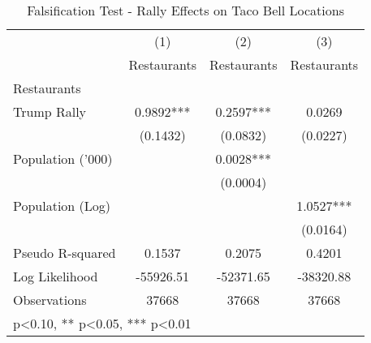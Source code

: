 \begin{table}[htbp]\centering
\def\sym#1{\ifmmode^{#1}\else\(^{#1}\)\fi}
\caption{Falsification Test - Rally Effects on Taco Bell Locations}
\begin{tabular}{l*{3}{c}}
\hline\hline
                    &\multicolumn{1}{c}{(1)}   &\multicolumn{1}{c}{(2)}   &\multicolumn{1}{c}{(3)}   \\
                    & Restaurants   & Restaurants   & Restaurants   \\
\hline
Restaurants         &               &               &               \\
Trump Rally         &      0.9892***&      0.2597***&      0.0269   \\
                    &    (0.1432)   &    (0.0832)   &    (0.0227)   \\
Population ('000)   &               &      0.0028***&               \\
                    &               &    (0.0004)   &               \\
Population (Log)    &               &               &      1.0527***\\
                    &               &               &    (0.0164)   \\
\hline
Pseudo R-squared    &      0.1537   &      0.2075   &      0.4201   \\
Log Likelihood      &   -55926.51   &   -52371.65   &   -38320.88   \\
Observations        &       37668   &       37668   &       37668   \\
\hline\hline
\multicolumn{4}{l}{\footnotesize * p<0.10, ** p<0.05, *** p<0.01}\\
\end{tabular}
\end{table}
